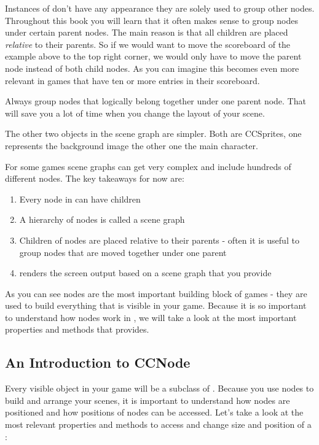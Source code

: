 Instances of \ccnode{} don't have any appearance they are solely used to
group other nodes. Throughout this book you will learn that it often makes sense
to group nodes under certain parent nodes. The main reason is that all children are placed
\textit{relative} to their parents. So if we would want to move the scoreboard
of the example above to the top right corner, we would only have to move the
parent node instead of both child nodes. As you can imagine this becomes
even more relevant in games that have ten or more entries in their scoreboard.

\begin{details} 
Always group nodes that logically belong together under one parent node. That
will save you a lot of time when you change the layout of your scene.
\end{details}

The other two objects in the scene graph are simpler. Both are CCSprites, one
represents the background image the other one the main character.

For some games scene graphs can get very complex and include hundreds of
different nodes. The key takeaways for now are:

\begin{enumerate}
  \item Every node in \cocos{} can have children
  \item A hierarchy of nodes is called a scene graph
  \item Children of nodes are placed relative to their parents - often it is
  useful to group nodes that are moved together under one parent
  \item \cocos{} renders the screen output based on a scene graph that you
  provide
\end{enumerate}

As you can see nodes are the most important building block of \cocos{} games -
they are used to build everything that is visible in your game. Because it
is so important to understand how nodes work in \cocos{}, we will take a look at
the most important properties and methods that \ccnode{} provides.

\subsection{An Introduction to CCNode}\label{Introduction_CCNode}
Every visible object in your game will be a subclass of \ccnode{}. Because
you use nodes to build and arrange your scenes, it is important to understand
how nodes are positioned and how positions of nodes can be accessed. Let's
take a look at the most relevant properties and methods to access and change
size and position of a \ccnode{}:

